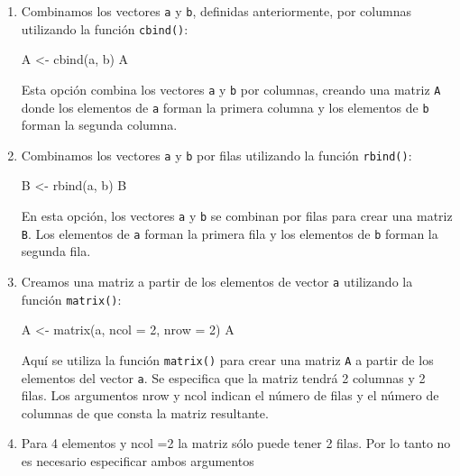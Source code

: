 \documentclass[
  jou,
  floatsintext,
  longtable,
  a4paper,
  nolmodern,
  notxfonts,
  notimes,
  colorlinks=true,linkcolor=blue,citecolor=blue,urlcolor=blue]{apa7}
\newenvironment{Shaded}{\begin{snugshade}}{\end{snugshade}}
\newcommand{\AttributeTok}[1]{\textcolor[rgb]{0.40,0.45,0.13}{#1}}
\newcommand{\DecValTok}[1]{\textcolor[rgb]{0.68,0.00,0.00}{#1}}
\newcommand{\FunctionTok}[1]{\textcolor[rgb]{0.28,0.35,0.67}{#1}}
\newcommand{\NormalTok}[1]{\textcolor[rgb]{0.00,0.23,0.31}{#1}}
\newcommand{\OtherTok}[1]{\textcolor[rgb]{0.00,0.23,0.31}{#1}}
\begin{document}
\begin{enumerate}
\def\labelenumi{\arabic{enumi}.}
\item
  Combinamos los vectores \texttt{a} y \texttt{b}, definidas
  anteriormente, por columnas utilizando la función \texttt{cbind()}:

\begin{Shaded}
\begin{Highlighting}[]
\NormalTok{A }\OtherTok{\textless{}{-}} \FunctionTok{cbind}\NormalTok{(a, b)}
\NormalTok{A}
\end{Highlighting}
\end{Shaded}

  Esta opción combina los vectores \texttt{a} y \texttt{b} por columnas,
  creando una matriz \texttt{A} donde los elementos de \texttt{a} forman
  la primera columna y los elementos de \texttt{b} forman la segunda
  columna.
\item
  Combinamos los vectores \texttt{a} y \texttt{b} por filas utilizando
  la función \texttt{rbind()}:

\begin{Shaded}
\begin{Highlighting}[]
\NormalTok{B }\OtherTok{\textless{}{-}} \FunctionTok{rbind}\NormalTok{(a, b)}
\NormalTok{B}
\end{Highlighting}
\end{Shaded}

  En esta opción, los vectores \texttt{a} y \texttt{b} se combinan por
  filas para crear una matriz \texttt{B}. Los elementos de \texttt{a}
  forman la primera fila y los elementos de \texttt{b} forman la segunda
  fila.
\item
  Creamos una matriz a partir de los elementos de vector \texttt{a}
  utilizando la función \texttt{matrix()}:

\begin{Shaded}
\begin{Highlighting}[]
\NormalTok{A }\OtherTok{\textless{}{-}} \FunctionTok{matrix}\NormalTok{(a, }\AttributeTok{ncol =} \DecValTok{2}\NormalTok{, }\AttributeTok{nrow =} \DecValTok{2}\NormalTok{)}
\NormalTok{A}
\end{Highlighting}
\end{Shaded}

  Aquí se utiliza la función \texttt{matrix()} para crear una matriz
  \texttt{A} a partir de los elementos del vector \texttt{a}. Se
  especifica que la matriz tendrá 2 columnas y 2 filas. Los argumentos
  nrow y ncol indican el número de filas y el número de columnas de que
  consta la matriz resultante.
\item
  Para 4 elementos y ncol =2 la matriz sólo puede tener 2 filas. Por lo
  tanto no es necesario especificar ambos argumentos


\end{enumerate}
\end{document}
